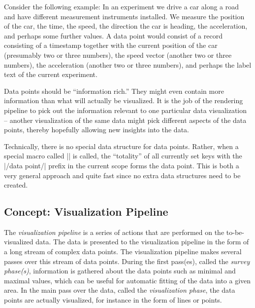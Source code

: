 Consider the following example: In an experiment we drive a car along
a road and have different measurement instruments installed. We
measure the position of the car, the time, the speed, the direction
the car is heading, the acceleration, and perhaps some further
values. A data point would consist of a record consisting of a
timestamp together with the current position of the car (presumably
two or three numbers), the speed vector (another two or three
numbers), the acceleration (another two or three numbers), and perhaps
the label text of the current experiment.

Data points should be ``information rich.'' They might even contain
more information than what will actually be visualized. It is the job
of the rendering pipeline to pick out the information relevant to one
particular data visualization -- another visualization of the same
data might pick different aspects of the data points, thereby
hopefully allowing new insights into the data.

Technically, there is no special data structure for data
points. Rather, when a special macro called |\pgfdatapoint| is called,
the ``totality'' of all currently set keys with the |/data point/|
prefix in the current scope forms the data point. This is both a very
general approach and quite fast since no extra data structures need to
be created.


\subsection{Concept: Visualization Pipeline}

The \emph{visualization pipeline} is a series of actions that are
performed on the to-be-visualized data. The
data is presented to the visualization pipeline in the form of a long
stream of  complex data points. The visualization pipeline makes
several passes over this stream of data points. During the first
pass(es), called the \emph{survey phase(s)}, information is gathered
about the data points such as minimal and maximal values, which can be
useful for automatic fitting of the data into a given area. In the
main pass over the data, called the \emph{visualization phase}, the
data points are actually visualized, for instance in the form of lines
or points.

